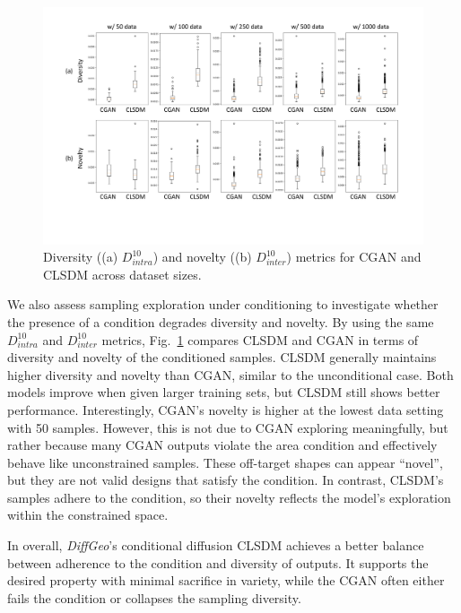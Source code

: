 \begin{figure}[!ht]
    \begin{center}
        \includegraphics[width=0.95\linewidth]{chapter6/fig/conditional_inter_intra_dist.pdf}
    \end{center}
    \vspace{-2mm}
    \caption{
        \small Diversity ((a) $D_{intra}^{10}$) and novelty  ((b) $D_{inter}^{10}$) metrics for CGAN and CLSDM across dataset sizes.  
    }
    \label{ch6:fig:main_benchmark_conditional_intra_inter_dist}
\end{figure}

We also assess sampling exploration under conditioning to investigate whether the presence of a condition degrades diversity and novelty. By using the same $D^{10}_{intra}$ and $D^{10}_{inter}$ metrics, Fig.~\ref{ch6:fig:main_benchmark_conditional_intra_inter_dist} compares CLSDM and CGAN in terms of diversity and novelty of the conditioned samples. CLSDM generally maintains higher diversity and novelty than CGAN, similar to the unconditional case. Both models improve when given larger training sets, but CLSDM still shows better performance. Interestingly, CGAN’s novelty is higher at the lowest data setting with 50 samples. However, this is not due to CGAN exploring meaningfully, but rather because many CGAN outputs violate the area condition and effectively behave like unconstrained samples. These off-target shapes can appear “novel”, but they are not valid designs that satisfy the condition. In contrast, CLSDM’s samples adhere to the condition, so their novelty reflects the model's exploration within the constrained space.

In overall, \textit{DiffGeo}’s conditional diffusion CLSDM achieves a better balance between adherence to the condition and diversity of outputs. It supports the desired property with minimal sacrifice in variety, while the CGAN often either fails the condition or collapses the sampling diversity.

